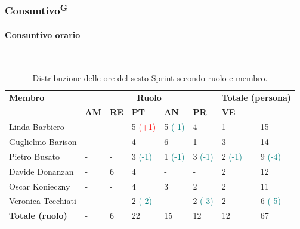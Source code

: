 \documentclass[8pt]{article}
\newcommand{\glossterm}[1]{#1\textsuperscript{G}} %
\newcommand{\subsubsubsection}[1]{\paragraph{#1}\mbox{}\\}
\begin{document}
\subsubsection{\glossterm{Consuntivo}}
\subsubsubsection{Consuntivo orario}
\begin{table}[ht!]
	\centering
	\begin{tabular}{p{3cm} p{1.4cm} p{1.6cm} p{1.7cm} p{1.4cm} p{1.4cm} p{1.5cm} p{2cm}}
		\toprule
        \textbf{Membro} & \multicolumn{5}{c}{\textbf{Ruolo}} & \multicolumn{2}{r}{\textbf{Totale (persona)}}\\
		& \textbf{AM} & \textbf{RE} & \textbf{PT} & \textbf{AN} & \textbf{PR} & \textbf{VE}\\
		\midrule
        Linda Barbiero          & -     & -     & 5 \textcolor{red}{(+1)}  & 5 \textcolor{teal}{(-1)} & 4                        & 1                        & 15 \\
        Guglielmo Barison       & -     & -     & 4                        & 6                        & 1                        & 3                        & 14 \\
        Pietro Busato           & -     & -     & 3 \textcolor{teal}{(-1)} & 1
        \textcolor{teal}{(-1)} & 3 \textcolor{teal}{(-1)} & 2 \textcolor{teal}{(-1)} & 9 \textcolor{teal}{(-4)} \\
        Davide Donanzan         & -     & 6     & 4                        & -                        & -                        & 2                        & 12 \\
        Oscar Konieczny         & -     & -     & 4                        & 3                        & 2                        & 2                        & 11 \\
        Veronica Tecchiati      & -     & -     & 2 \textcolor{teal}{(-2)} & -
        & 2 \textcolor{teal}{(-3)} & 2                        & 6 \textcolor{teal}{(-5)}\\
        \bottomrule
        \textbf{Totale (ruolo)} & - & 6 & 22 & 15 & 12 & 12 & 67 \\
		\bottomrule
	\end{tabular}
	\caption{Distribuzione delle ore del sesto Sprint secondo ruolo e membro.}
	\label{table:Distribuzione delle ore del sesto Sprint secondo ruolo e membr}
\end{table}
\end{document}
